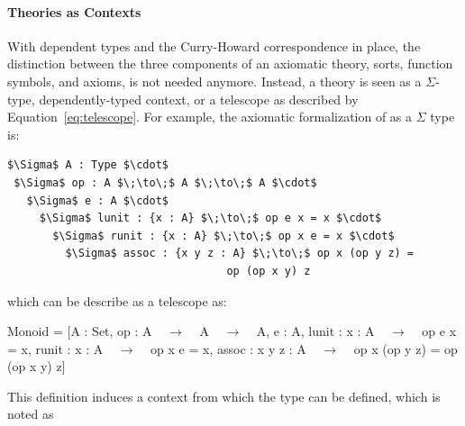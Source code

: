 \paragraph{Theories as Contexts}
With dependent types and the Curry-Howard correspondence in place, the distinction between the three components of an axiomatic theory, sorts, function symbols, and axioms, is not needed anymore. Instead, a theory is seen as a $\Sigma$-type, dependently-typed context, or a telescope as described by Equation~\ref{eq:telescope}. 
For example, the axiomatic formalization of  as a $\Sigma$ type is: 
\begin{lstlisting}[mathescape]
$\Sigma$ A : Type $\cdot$ 
 $\Sigma$ op : A $\;\to\;$ A $\;\to\;$ A $\cdot$ 
   $\Sigma$ e : A $\cdot$  
     $\Sigma$ lunit : {x : A} $\;\to\;$ op e x = x $\cdot$
       $\Sigma$ runit : {x : A} $\;\to\;$ op x e = x $\cdot$
         $\Sigma$ assoc : {x y z : A} $\;\to\;$ op x (op y z) = 
                                  op (op x y) z
\end{lstlisting} 
\noindent which can be describe as a telescope as:  
\begin{togcode} 
Monoid = [A : Set, op : A ~$\;\to\;$~ A ~$\;\to\;$~ A, e : A, 
          lunit : {x : A} ~$\;\to\;$~ op e x = x, 
          runit : {x : A} ~$\;\to\;$~ op x e = x, 
          assoc : {x y z : A} ~$\;\to\;$~ op x (op y z) = op (op x y) z] 
\end{togcode} 
\noindent This definition induces a context from which the type  can be defined, which is noted as   



